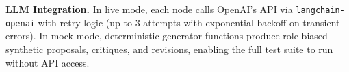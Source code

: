 \textbf{LLM Integration.}
In live mode, each node calls OpenAI's API via \texttt{langchain-openai} with retry logic (up to 3 attempts with exponential backoff on transient errors). In mock mode, deterministic generator functions produce role-biased synthetic proposals, critiques, and revisions, enabling the full test suite to run without API access.
